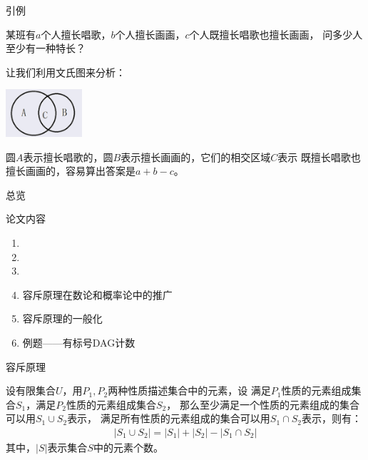 \documentclass[allowframebreaks,9pt]{beamer}
\title[浅谈容斥原理]{\Huge浅谈容斥原理}
\author[王~迪]{\\[1.0em] \huge\itshape{王~迪} \\[0.5em]}
\institute[成都七中]{
	{\large\itshape 成都七中} \\[-1.5ex]
}
\date{2013年4月}
\begin{document}
\begin{frame}[plain]
\titlepage
\end{frame}

\begin{frame}{引例}

\begin{problem}
某班有$a$个人擅长唱歌，$b$个人擅长画画，$c$个人既擅长唱歌也擅长画画，
问多少人至少有一种特长？
\end{problem}
\pause
\begin{solution}
让我们利用文氏图来分析：
\begin{center}
\includegraphics[height=50pt]{venn_0.png}
\end{center}
圆$A$表示擅长唱歌的，圆$B$表示擅长画画的，它们的相交区域$C$表示
既擅长唱歌也擅长画画的，容易算出答案是$a+b-c$。
\end{solution}

\end{frame}

\begin{frame}{总览}

\begin{block}{论文内容}
\begin{enumerate}
\item {}
\item {}
\item {}
\item 容斥原理在数论和概率论中的推广
\item 容斥原理的一般化
\item 例题——有标号DAG计数
\end{enumerate}
\end{block}

\end{frame}

\begin{frame}{容斥原理}

设有限集合$U$，用$P_1,P_2$两种性质描述集合中的元素，设
满足$P_1$性质的元素组成集合$S_1$，满足$P_2$性质的元素组成集合$S_2$，
那么{\color{red}至少满足一个性质}的元素组成的集合可以用$S_1 \cup S_2$表示，
{\color{red}满足所有性质}的元素组成的集合可以用$S_1 \cap S_2$表示，则有：
\begin{eqnarray*}
|S_1 \cup S_2| = |S_1| + |S_2| - |S_1 \cap S_2|
\end{eqnarray*}
其中，$|S|$表示集合$S$中的元素个数。 \\

\end{frame}
\end{document}
